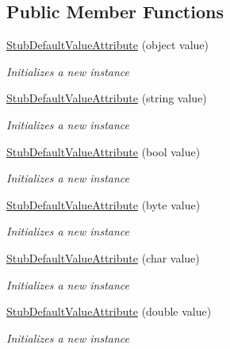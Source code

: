 \subsection*{Public Member Functions}
\begin{DoxyCompactItemize}
\item 
\hyperlink{class_system_1_1_component_model_1_1_fakes_1_1_stub_default_value_attribute_ab8499bd9929905881954d4b35c9b6776}{Stub\-Default\-Value\-Attribute} (object value)
\begin{DoxyCompactList}\small\item\em Initializes a new instance\end{DoxyCompactList}\item 
\hyperlink{class_system_1_1_component_model_1_1_fakes_1_1_stub_default_value_attribute_a1a50cb3e1ac1dcb4b9aac27a3449cc2d}{Stub\-Default\-Value\-Attribute} (string value)
\begin{DoxyCompactList}\small\item\em Initializes a new instance\end{DoxyCompactList}\item 
\hyperlink{class_system_1_1_component_model_1_1_fakes_1_1_stub_default_value_attribute_a7bd4f551424b4d99ef5ed11ae8fbeae7}{Stub\-Default\-Value\-Attribute} (bool value)
\begin{DoxyCompactList}\small\item\em Initializes a new instance\end{DoxyCompactList}\item 
\hyperlink{class_system_1_1_component_model_1_1_fakes_1_1_stub_default_value_attribute_a707aaae871f79f3535bbb76ea6d3f23d}{Stub\-Default\-Value\-Attribute} (byte value)
\begin{DoxyCompactList}\small\item\em Initializes a new instance\end{DoxyCompactList}\item 
\hyperlink{class_system_1_1_component_model_1_1_fakes_1_1_stub_default_value_attribute_ad0febe66ad5d33b6c14a7f447f6e24c7}{Stub\-Default\-Value\-Attribute} (char value)
\begin{DoxyCompactList}\small\item\em Initializes a new instance\end{DoxyCompactList}\item 
\hyperlink{class_system_1_1_component_model_1_1_fakes_1_1_stub_default_value_attribute_a12e3557c0e06c9b24442ee79b735c7f6}{Stub\-Default\-Value\-Attribute} (double value)
\begin{DoxyCompactList}\small\item\em Initializes a new instance\end{DoxyCompactList}\item 

\end{DoxyCompactItemize}

